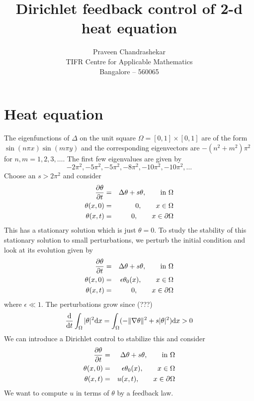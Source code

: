 \documentclass[11pt, oneside]{article}   	%
\title{Dirichlet feedback control of 2-d heat equation}
\author{Praveen Chandrashekar\\
TIFR Centre for Applicable Mathematics\\
Bangalore -- 560065}
\date{}
\newcommand{\bOmega}{{\partial\Omega}}
\begin{document}

\maketitle
\section{Heat equation}
The eigenfunctions of $\Delta$ on the unit square $\Omega=[0,1]\times[0,1]$ are of the form $\sin(n\pi x)\sin(m\pi y)$ and the corresponding eigenvectors are $-(n^2+m^2)\pi^2$ for $n,m=1,2,3,\ldots$. The first few eigenvalues are given by
\[
-2\pi^2, -5\pi^2, -5\pi^2, -8\pi^2, -10\pi^2, -10\pi^2, \ldots
\]
Choose an $s > 2 \pi^2$ and consider
\begin{eqnarray*}
\df{\theta}{t} &=& \Delta\theta + s \theta, \qquad \textrm{in } \Omega \\
\theta(x,0) &=& 0, \qquad x \in \Omega \\
\theta(x,t) &=& 0, \qquad x \in \bOmega
\end{eqnarray*}
This has a stationary solution which is just $\theta = 0$. To study the stability of this stationary solution to small perturbations, we perturb the initial condition and look at its evolution given by
\begin{eqnarray*}
\df{\theta}{t} &=& \Delta\theta + s \theta, \qquad \textrm{in } \Omega \\
\theta(x,0) &=& \epsilon\theta_0(x), \qquad x \in \Omega \\
\theta(x,t) &=& 0, \qquad x \in \bOmega
\end{eqnarray*}
where $\epsilon \ll 1$. The perturbations grow since (???)
\[
\frac{\mbox{d} }{\mbox{d} t} \int_\Omega |\theta|^2 \mbox{d} x = \int_\Omega ( -\| \nabla\theta \|^2 + s |
\theta|^2) \mbox{d} x > 0
\]
We can introduce a Dirichlet control to stabilize this and consider
\begin{eqnarray*}
\frac{\partial \theta}{\partial t} &=& \Delta\theta + s \theta, \qquad \textrm{in } \Omega \\
\theta(x,0) &=& \epsilon\theta_0(x), \qquad x \in \Omega \\
\theta(x,t) &=& u(x,t), \qquad x \in \partial\Omega
\end{eqnarray*}
We want to compute $u$ in terms of $\theta$ by a feedback law.
\end{document}
